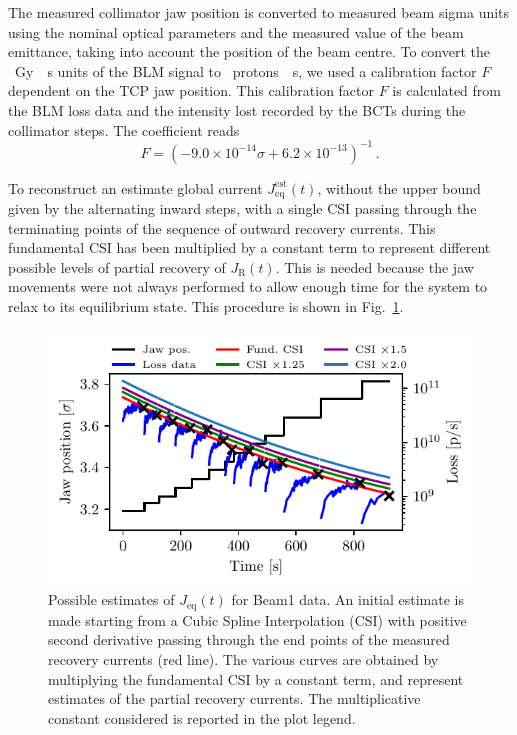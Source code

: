 The measured collimator jaw position is converted to measured beam sigma units using the nominal optical parameters and the measured value of the beam emittance, taking into account the position of the beam centre. To convert the \SI{}{Gy \per s} units of the BLM signal to \SI{}{protons \per s}, we used a calibration factor $F$~\cite{arek} dependent on the TCP jaw position. This calibration factor $F$ is calculated from the BLM loss data and the intensity lost recorded by the BCTs during the collimator steps. The coefficient reads 
\begin{equation}
    F = \left(-9.0\times10^{-14}\sigma + 6.2\times10^{-13}\right)^{-1} \,.
\end{equation}

To reconstruct an estimate global current $J_\text{eq}^{\text{est}}(t)$, without the upper bound given by the alternating inward steps, with a single CSI passing through the terminating points of the sequence of outward recovery currents. This fundamental CSI has been multiplied by a constant term to represent different possible levels of partial recovery of $J_\mathrm{R}(t)$. This is needed because the jaw movements were not always performed to allow enough time for the system to relax to its equilibrium state. This procedure is shown in Fig.~\ref{fig:second}.

%
\begin{figure}
    \centering
    \includegraphics[trim={0 2.5mm 0 3mm}, clip, width=\columnwidth]{5_Diffusion_measurement_LHC/figs/second_bis.pdf}
    \caption{Possible estimates of $J_\mathrm{eq}(t)$ for Beam1 data. An initial estimate is made starting from a Cubic Spline Interpolation (CSI) with positive second derivative passing through the end points of the measured recovery currents (red line). The various curves are obtained by multiplying the fundamental CSI by a constant term, and represent estimates of the partial recovery currents. The multiplicative constant considered is reported in the plot legend.}
    \label{fig:second}
\end{figure}
%

